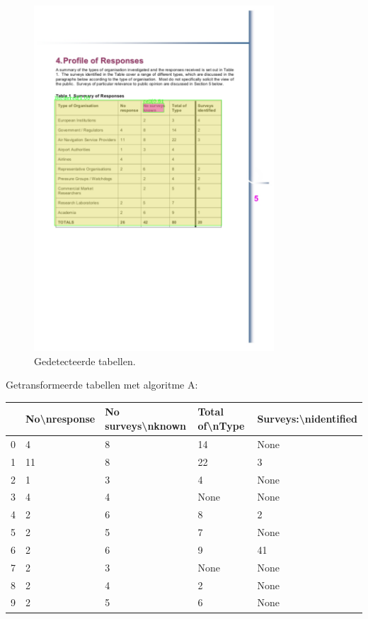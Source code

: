 \begin{figure}[H]
    \centering
    \includegraphics[width=0.8\textwidth]{test-resultaten/18/detected_tables.png}
    \caption{Gedetecteerde tabellen.}
\end{figure}

Getransformeerde tabellen met algoritme A:

\begin{tabular}{lllll}
\toprule
{} & No\textbackslash nresponse & No surveys\textbackslash nknown & Total of\textbackslash nType & Surveys:\textbackslash nidentified \\
\midrule
0 &            4 &                 8 &             14 &                 None \\
1 &           11 &                 8 &             22 &                    3 \\
2 &            1 &                 3 &              4 &                 None \\
3 &            4 &                 4 &           None &                 None \\
4 &            2 &                 6 &              8 &                    2 \\
5 &            2 &                 5 &              7 &                 None \\
6 &            2 &                 6 &              9 &                   41 \\
7 &            2 &                 3 &           None &                 None \\
8 &            2 &                 4 &              2 &                 None \\
9 &            2 &                 5 &              6 &                 None \\
\bottomrule
\end{tabular}


